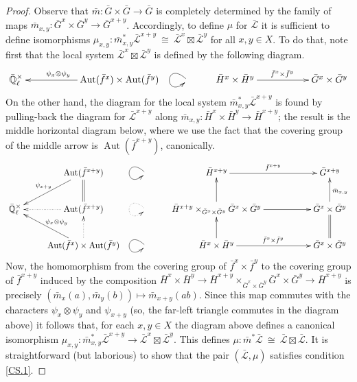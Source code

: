 \documentclass[11pt]{amsart}
\theoremstyle{plain}
\theoremstyle{definition}
\theoremstyle{remark}
\newcommand{\EE}{\mathbb{\bar Q}_\ell}
\DeclareMathOperator{\Aut}{Aut}
\newcommand{\iso}{{\ \cong\ }}
\newcommand{\gcs}[1]{{\mathcal{\bar #1}}}
\begin{document}
\begin{proof}
Observe that ${\bar m}: {\bar G}\times {\bar G}\to {\bar G}$ is completely determined by the family of maps ${\bar m}_{x,y} : {\bar G}^x \times {\bar G}^{y} \to {\bar G}^{x+y}$. Accordingly, to define $\mu$ for $\gcs{L}$ it is sufficient to define isomorphisms $\mu_{x,y} : {\bar m}_{x,y}^*\gcs{L}^{x+y} \iso \gcs{L}^{x}\boxtimes \gcs{L}^{y}$ for all $x,y\in X$. To do that, note first that the local system $\gcs{L}^{x}\boxtimes \gcs{L}^{y}$ is defined by the following diagram.
\[
\xymatrix{
\EE^\times && \ar[ll]_{\hskip-20pt \psi_x\otimes \psi_y} \Aut({\bar f}^x)\times \Aut({\bar f}^y)  
& \ar@(ul,dl) & {\bar H}^x\times {\bar H}^y \ar[rr]^{{\bar f}^x\times {\bar f}^y} && {\bar G}^x\times {\bar G}^y\\ 
}
\]
On the other hand, the diagram for the local system ${\bar m}_{x,y}^* \gcs{L}^{x+y}$ is found by pulling-back the diagram for $\gcs{L}^{x+y}$ along ${\bar m}_{x,y} : {\bar H}^x\times{\bar H}^y \to {\bar H}^{x+y}$; the result is the middle horizontal diagram below, where we use the fact that the covering group of the middle arrow is $\Aut({\bar f}^{x+y})$, canonically.
\[
\xymatrix{ 
& \ar[dl]_{\psi_{x+y}} \Aut({\bar f}^{x+y})  
& \ar@(ul,dl) & {\bar H}^{x+y} \ar[rr]^{{\bar f}^{x+y}} && {\bar G}^{x+y}\\ 
\EE^\times & \ar@{.>}[l] \Aut({\bar f}^{x+y})  \ar@{=}[u] &  \ar@{.>}@(ul,dl) & \ar[u] {\bar H}^{x+y} \times_{{\bar G}^x\times{\bar G}^y} {\bar G}^x\times{\bar G}^y \ar[rr] && \ar[u]_{{\bar m}_{x,y}} {\bar G}^x\times {\bar G}^y\\
& \ar[lu]_{\psi_x\otimes \psi_y} \ar@{.>}[u] \Aut({\bar f}^x)\times \Aut({\bar f}^y)  
& \ar@(ul,dl) & \ar[u] {\bar H}^x\times {\bar H}^y \ar[rr]^{{\bar f}^x\times {\bar f}^y} && \ar@{=}[u] {\bar G}^x\times {\bar G}^y\\ 
}
\]
Now, the homomorphism from the covering group of ${\bar f}^x\times{\bar f}^y$ to the covering group of ${\bar f}^{x+y}$ induced by the composition $ {\bar H}^x\times {\bar H}^y \to {\bar H}^{x+y} \times_{{\bar G}^x\times{\bar G}^y} {\bar G}^x\times{\bar G}^y \to {\bar H}^{x+y}$ is precisely $({\bar m}_x(a),{\bar m}_y(b)) \mapsto {\bar m}_{x+y}(ab)$. Since this map commutes with the characters $\psi_x\otimes\psi_y$ and $\psi_{x+y}$ (so, the far-left triangle commutes in the diagram above) it follows that, for each $x,y\in X$ the diagram above defines a canonical isomorphism
$\mu_{x,y} : {\bar m}_{x,y}^* \gcs{L}^{x+y} \to \gcs{L}^x \boxtimes\gcs{L}^y$.
This defines $\mu: {\bar m}^* \gcs{L} \iso \gcs{L} \boxtimes\gcs{L}$. It is straightforward (but laborious) to show that the pair $(\gcs{L},\mu)$ satisfies condition \ref{CS.1}.


\end{proof}
\end{document}
